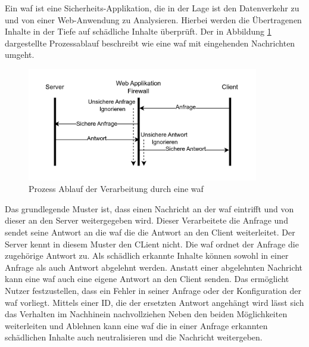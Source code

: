 \label{chap:waf-theory}
Ein \ac{waf} ist eine Sicherheits-Applikation, die in der Lage ist den Datenverkehr zu und von einer Web-Anwendung zu Analysieren.
Hierbei werden die Übertragenen Inhalte in der Tiefe auf schädliche Inhalte überprüft.
Der in Abbildung \ref{fig:waf-porcess-flow} dargestellte Prozessablauf beschreibt wie eine \ac{waf} mit eingehenden Nachrichten umgeht.

\begin{figure}[!hbt]
    \centering
    \includegraphics[width=0.9\textwidth]{./images/Waf-Process-fliow.png}
    \caption{Prozess Ablauf der Verarbeitung durch eine \ac{waf}}
    \label{fig:waf-porcess-flow}
\end{figure}

Das grundlegende Muster ist, dass einen Nachricht an der \ac{waf} eintrifft und von dieser an den Server weitergegeben wird.
Dieser Verarbeitete die Anfrage und sendet seine Antwort an die \ac{waf} die die Antwort an den Client weiterleitet.
Der Server kennt in diesem Muster den CLient nicht.
Die \ac{waf} ordnet der Anfrage die zugehörige Antwort zu.
Als schädlich erkannte Inhalte können sowohl in einer Anfrage als auch Antwort abgelehnt werden.
Anstatt einer abgelehnten Nachricht kann eine \ac{waf} auch eine eigene Antwort an den Client senden.
Das ermöglicht Nutzer festzustellen, dass ein Fehler in seiner Anfrage oder der Konfiguration der \ac{waf} vorliegt.
Mittels einer ID, die der ersetzten Antwort angehängt wird lässt sich das Verhalten im Nachhinein nachvollziehen
Neben den beiden Möglichkeiten weiterleiten und Ablehnen kann eine \ac{waf} die in einer Anfrage erkannten schädlichen Inhalte auch neutralisieren und die Nachricht weitergeben.

